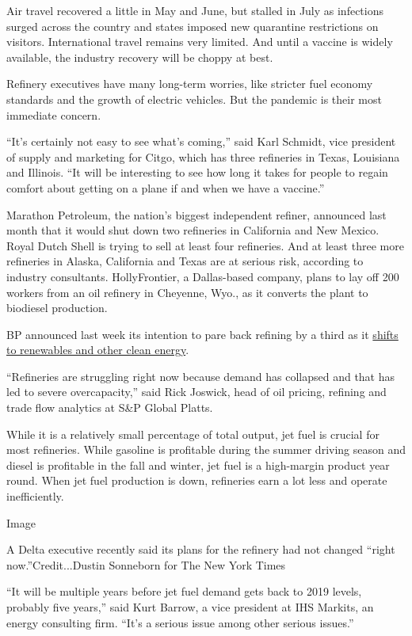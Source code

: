 Air travel recovered a little in May and June, but stalled in July as
infections surged across the country and states imposed new quarantine
restrictions on visitors. International travel remains very limited. And
until a vaccine is widely available, the industry recovery will be
choppy at best.

Refinery executives have many long-term worries, like stricter fuel
economy standards and the growth of electric vehicles. But the pandemic
is their most immediate concern.

``It's certainly not easy to see what's coming,'' said Karl Schmidt,
vice president of supply and marketing for Citgo, which has three
refineries in Texas, Louisiana and Illinois. ``It will be interesting to
see how long it takes for people to regain comfort about getting on a
plane if and when we have a vaccine.''

Marathon Petroleum, the nation's biggest independent refiner, announced
last month that it would shut down two refineries in California and New
Mexico. Royal Dutch Shell is trying to sell at least four refineries.
And at least three more refineries in Alaska, California and Texas are
at serious risk, according to industry consultants. HollyFrontier, a
Dallas-based company, plans to lay off 200 workers from an oil refinery
in Cheyenne, Wyo., as it converts the plant to biodiesel production.

BP announced last week its intention to pare back refining by a third as
it
\href{https://www.nytimes3xbfgragh.onion/2020/08/04/business/energy-environment/bp-renewable-investment.html}{shifts
to renewables and other clean energy}.

``Refineries are struggling right now because demand has collapsed and
that has led to severe overcapacity,'' said Rick Joswick, head of oil
pricing, refining and trade flow analytics at S\&P Global Platts.

While it is a relatively small percentage of total output, jet fuel is
crucial for most refineries. While gasoline is profitable during the
summer driving season and diesel is profitable in the fall and winter,
jet fuel is a high-margin product year round. When jet fuel production
is down, refineries earn a lot less and operate inefficiently.

Image

A Delta executive recently said its plans for the refinery had not
changed ``right now.''Credit...Dustin Sonneborn for The New York Times

``It will be multiple years before jet fuel demand gets back to 2019
levels, probably five years,'' said Kurt Barrow, a vice president at IHS
Markits, an energy consulting firm. ``It's a serious issue among other
serious issues.''

